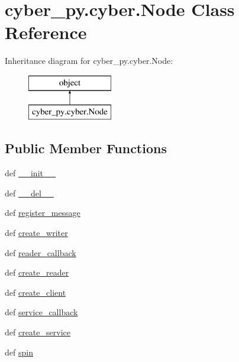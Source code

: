 \hypertarget{classcyber__py_1_1cyber_1_1Node}{\section{cyber\-\_\-py.\-cyber.\-Node Class Reference}
\label{classcyber__py_1_1cyber_1_1Node}
}
Inheritance diagram for cyber\-\_\-py.\-cyber.\-Node\-:\begin{figure}[H]
\begin{center}
\leavevmode
\includegraphics[height=2.000000cm]{classcyber__py_1_1cyber_1_1Node}
\end{center}
\end{figure}
\subsection*{Public Member Functions}
\begin{DoxyCompactItemize}
\item 
def \hyperlink{classcyber__py_1_1cyber_1_1Node_a7ed5cbe9188a3e758e9e3d25ac375d7c}{\-\_\-\-\_\-init\-\_\-\-\_\-}
\item 
def \hyperlink{classcyber__py_1_1cyber_1_1Node_ab458e2836cf1ddff40e94b9ac4552da2}{\-\_\-\-\_\-del\-\_\-\-\_\-}
\item 
def \hyperlink{classcyber__py_1_1cyber_1_1Node_a114d1b9766de4aa0d51507e3f15896ec}{register\-\_\-message}
\item 
def \hyperlink{classcyber__py_1_1cyber_1_1Node_a04929ca39d6ab0a6ce9a7464da05bdf4}{create\-\_\-writer}
\item 
def \hyperlink{classcyber__py_1_1cyber_1_1Node_aeb4ffff77bb79bed4c88c2f339dc354b}{reader\-\_\-callback}
\item 
def \hyperlink{classcyber__py_1_1cyber_1_1Node_ae688186c7437c468d97200d1c8e6c461}{create\-\_\-reader}
\item 
def \hyperlink{classcyber__py_1_1cyber_1_1Node_a66ba57a5a8eeeb7a3951e278d59dc73b}{create\-\_\-client}
\item 
def \hyperlink{classcyber__py_1_1cyber_1_1Node_a83d825faba3823b920a8351639819d7a}{service\-\_\-callback}
\item 
def \hyperlink{classcyber__py_1_1cyber_1_1Node_a462c5baf7e7865e3748444f9bc25d1a3}{create\-\_\-service}
\item 
def \hyperlink{classcyber__py_1_1cyber_1_1Node_aa84f141f87c59573e91b7e475eda24cb}{spin}
\end{DoxyCompactItemize}
